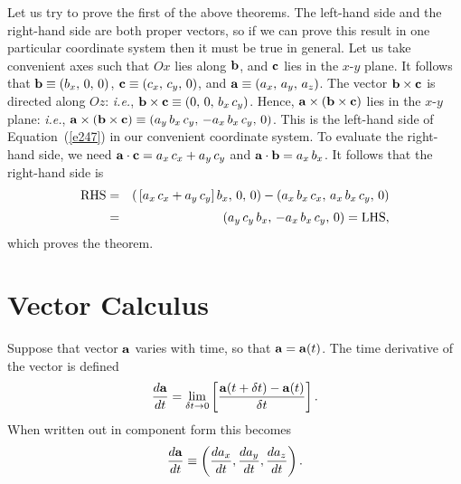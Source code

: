 Let us try to prove the first of the above theorems. The left-hand side and the
right-hand side are both proper vectors, so if we can prove this result in one particular
coordinate system then it must be true in general. Let us take convenient axes such that 
$Ox$ lies along ${\bf b}$, and ${\bf c}$ lies in the $x$-$y$ plane. It follows that
${\bf b} \equiv (b_x,\,0,\,0)$, ${\bf c} \equiv (c_x,\, c_y,\, 0)$, and ${\bf a} \equiv (a_x,\, a_y,\, a_z)$. 
The vector ${\bf b}\times {\bf c}$ is directed along $Oz$: {\em i.e.}, 
${\bf b}\times{\bf c} \equiv (0,\,0,\,b_x\, c_y)$. Hence, ${\bf a}\times({\bf b}\times{\bf c})$
lies in the $x$-$y$ plane:  {\em i.e.}, ${\bf a}\times({\bf b}\times{\bf c}) \equiv (a_y \,b_x\, c_y,\, -a_x\, b_x\, c_y,\, 0)$.
This is the left-hand side of Equation~(\ref{e247}) in our convenient coordinate system. To evaluate the right-hand side,
we need ${\bf a}\cdot {\bf c} = a_x \,c_x + a_y\, c_y$ and ${\bf a}\cdot {\bf b} = a_x \,b_x$.
It follows that the right-hand side is 
\begin{eqnarray}
{\rm RHS} &= &(\,[a_x\, c_x + a_y \,c_y]\, b_x,\, 0,\, 0) - (a_x \,b_x \,c_x,\, a_x\, b_x\, c_y,\, 0)\nonumber\\[0.5ex]
&=& (a_y\, c_y\, b_x,\, -a_x\, b_x\, c_y,\, 0 ) = {\rm LHS},
\end{eqnarray}
which proves the theorem.

\section{Vector Calculus}\label{s28}
Suppose that  vector ${\bf a}$ varies with time, so that ${\bf a} = {\bf a} (t)$. The time
derivative of the vector is defined
\begin{equation}
\frac{d {\bf a}}{dt} = \lim_{\delta t\rightarrow 0} \left[\frac{{\bf a}(t+\delta t) - {\bf a}(t)}
{\delta t}\right].
\end{equation}
When written out in component form this becomes
\begin{equation}
\frac{d {\bf a}}{dt} \equiv \left(\frac{d a_x}{dt}, \frac{d a_y}{d t}, \frac{d a_z}{ d t}\right).
\end{equation} 

